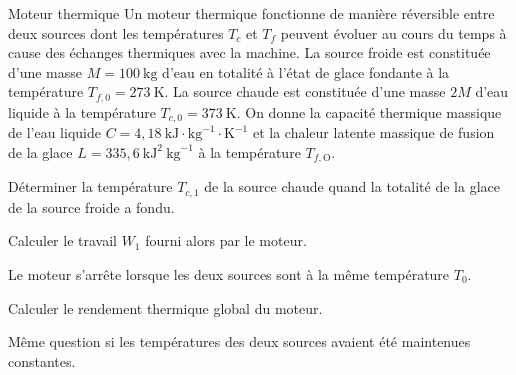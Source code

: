 \begin{exo}[PC][1][colle]{Moteur thermique}
Un moteur thermique fonctionne de manière réversible entre deux sources dont les températures $T_c$ et $T_f$ peuvent évoluer au cours du temps à cause des échanges thermiques avec la machine. La source froide est constituée d'une masse $M=100 \mathrm{~kg}$ d'eau en totalité à l'état de glace fondante à la température $T_{f, 0}=273 \mathrm{~K}$. La source chaude est constituée d'une masse $2 M$ d'eau liquide à la température $T_{c, 0}=373 \mathrm{~K}$. On donne la capacité thermique massique de l'eau liquide $C=4,18 \mathrm{~kJ} \cdot \mathrm{kg}^{-1} \cdot \mathrm{K}^{-1}$ et la chaleur latente massique de fusion de la glace $L=335,6 \mathrm{~kJ}^2 \mathrm{~kg}^{-1}$ à la température $T_{f, \mathrm{O}}$.
\begin{quest}
	\item Déterminer la température $T_{c, 1}$ de la source chaude quand la totalité de la glace de la source froide a fondu.
	\item Calculer le travail $W_1$ fourni alors par le moteur.
	\item Le moteur s'arrête lorsque les deux sources sont à la même température $T_0$.
	\item Calculer le rendement thermique global du moteur.
	\item Même question si les températures des deux sources avaient été maintenues constantes.
\end{quest}
\end{exo}

